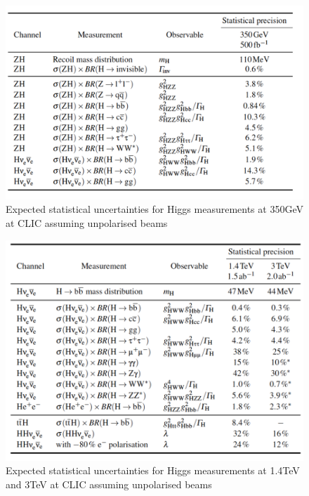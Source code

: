 \begin{figure}
  \centering
  \includegraphics[width=0.7\linewidth]{Theory/fig/table28_350GeVPrecisions}
  \caption[Expected statistical uncertainties for Higgs measurements at 350GeV at CLIC assuming unpolarised beams]{Expected statistical uncertainties for Higgs measurements at 350GeV at CLIC assuming unpolarised beams \cite{Abramowicz:2016zbo}}
  \label{fig:350GeVNumbers}
\end{figure}

\begin{figure}
  \centering
  \includegraphics[width=0.7\linewidth]{Theory/fig/table29_HighEPrecisions}
  \caption[Expected statistical uncertainties for Higgs measurements at 1.4TeV and 3TeV at CLIC assuming unpolarised beams]{Expected statistical uncertainties for Higgs measurements at 1.4TeV and 3TeV at CLIC assuming unpolarised beams \cite{Abramowicz:2016zbo}}
  \label{fig:HighENumbers}
\end{figure}

